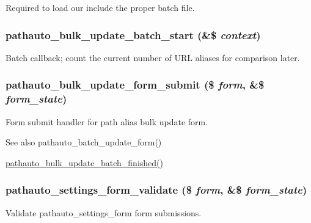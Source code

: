 Required to load our include the proper batch file. \hypertarget{pathauto_8admin_8inc_a7d546d06b26c9c05c3d69e74b729afc2}{
\subsubsection[{pathauto\_\-bulk\_\-update\_\-batch\_\-start}]{\setlength{\rightskip}{0pt plus 5cm}pathauto\_\-bulk\_\-update\_\-batch\_\-start (\&\$ {\em context})}}
\label{pathauto_8admin_8inc_a7d546d06b26c9c05c3d69e74b729afc2}
Batch callback; count the current number of URL aliases for comparison later. \hypertarget{pathauto_8admin_8inc_a34661ac29b8c6d623ed9437ad194cfa4}{
\subsubsection[{pathauto\_\-bulk\_\-update\_\-form\_\-submit}]{\setlength{\rightskip}{0pt plus 5cm}pathauto\_\-bulk\_\-update\_\-form\_\-submit (\$ {\em form}, \/  \&\$ {\em form\_\-state})}}
\label{pathauto_8admin_8inc_a34661ac29b8c6d623ed9437ad194cfa4}
Form submit handler for path alias bulk update form.

\begin{DoxySeeAlso}{See also}
pathauto\_\-batch\_\-update\_\-form() 

\hyperlink{pathauto_8admin_8inc_aa4e5f7dbb4b2173c5851759c4c4a6ac0}{pathauto\_\-bulk\_\-update\_\-batch\_\-finished()} 
\end{DoxySeeAlso}
\hypertarget{pathauto_8admin_8inc_ad27c29d292443ece46bfff41aee9c577}{
\subsubsection[{pathauto\_\-settings\_\-form\_\-validate}]{\setlength{\rightskip}{0pt plus 5cm}pathauto\_\-settings\_\-form\_\-validate (\$ {\em form}, \/  \&\$ {\em form\_\-state})}}
\label{pathauto_8admin_8inc_ad27c29d292443ece46bfff41aee9c577}
Validate pathauto\_\-settings\_\-form form submissions. 